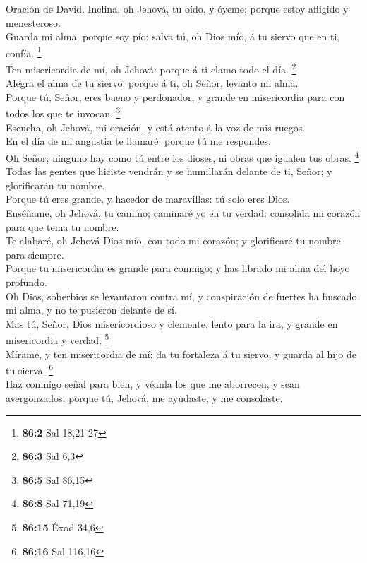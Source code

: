  Oración de David. Inclina, oh Jehová, tu oído, y óyeme;
porque estoy afligido y menesteroso.\\
 Guarda mi alma, porque soy pío: salva tú, oh Dios mío, á tu
siervo que en ti, confía. \footnote{\textbf{86:2} Sal 18,21-27}\\
 Ten misericordia de mí, oh Jehová: porque á ti clamo todo
el día. \footnote{\textbf{86:3} Sal 6,3}\\
 Alegra el alma de tu siervo: porque á ti, oh Señor, levanto
mi alma.\\
 Porque tú, Señor, eres bueno y perdonador, y grande en
misericordia para con todos los que te invocan. \footnote{\textbf{86:5}
  Sal 86,15}\\
 Escucha, oh Jehová, mi oración, y está atento á la voz de
mis ruegos.\\
 En el día de mi angustia te llamaré: porque tú me
respondes.\\
 Oh Señor, ninguno hay como tú entre los dioses, ni obras
que igualen tus obras. \footnote{\textbf{86:8} Sal 71,19}\\
 Todas las gentes que hiciste vendrán y se humillarán
delante de ti, Señor; y glorificarán tu nombre.\\
 Porque tú eres grande, y hacedor de maravillas: tú solo
eres Dios.\\
 Enséñame, oh Jehová, tu camino; caminaré yo en tu verdad:
consolida mi corazón para que tema tu nombre.\\
 Te alabaré, oh Jehová Dios mío, con todo mi corazón; y
glorificaré tu nombre para siempre.\\
 Porque tu misericordia es grande para conmigo; y has
librado mi alma del hoyo profundo.\\
 Oh Dios, soberbios se levantaron contra mí, y conspiración
de fuertes ha buscado mi alma, y no te pusieron delante de sí.\\
 Mas tú, Señor, Dios misericordioso y clemente, lento para
la ira, y grande en misericordia y verdad; \footnote{\textbf{86:15} Éxod
  34,6}\\
 Mírame, y ten misericordia de mí: da tu fortaleza á tu
siervo, y guarda al hijo de tu sierva. \footnote{\textbf{86:16} Sal
  116,16}\\
 Haz conmigo señal para bien, y véanla los que me
aborrecen, y sean avergonzados; porque tú, Jehová, me ayudaste, y me
consolaste.

